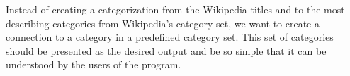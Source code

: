 

Instead of creating a categorization from the Wikipedia titles and to the most describing categories from Wikipedia's category set, we want to create a connection to a category in a predefined category set. This set of categories should be presented as the desired output and be so simple that it can be understood by the users of the program. 

